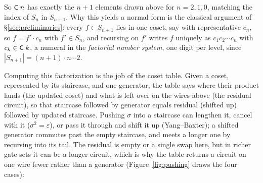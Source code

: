 \noindent So $\mbox{\textsf{\small C}}\;n$ has exactly the $n{+}1$ elements drawn above
for $n = 2, 1, 0$, matching the index of $S_n$ in $S_{n+1}$.  Why this yields
a normal form is the classical argument of \S\ref{sec:preliminaries}:
every $f \in S_{n+1}$ lies in one coset, say with representative $c_n$,
so $f = f' \cdot c_n$ with $f' \in S_n$, and recursing on $f'$ writes $f$
uniquely as $c_1 c_2 \cdots c_n$ with $c_k \in \mbox{\textsf{\small C}}\;k$, a numeral
in the \emph{factorial number system}, one digit per level, since
$|S_{n+1}| = (n{+}1) \cdot n \cdots 2$.

Computing this factorization is the job of the coset table.
Given a coset, represented by its staircase, and one generator, the
table says where their product lands (the updated coset) and what
is left over on the wires above (the residual circuit), so that
staircase followed by generator equals residual (shifted up) followed by
updated staircase.
Pushing $\sigma$ into a staircase can lengthen it, cancel with it ($\sigma^2 =
\varepsilon$), or pass it through and shift it up (Yang--Baxter); a
shifted generator commutes past the empty staircase, and meets a longer
one by recursing into its tail.  The residual is empty or a single swap here, but in richer
gate sets it can be a longer circuit, which is why the table returns a
circuit on one wire fewer rather than a generator
(Figure~\ref{fig:pushing} draws the four cases):

